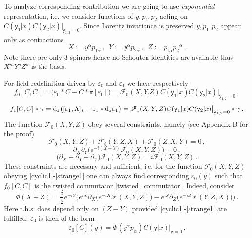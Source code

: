 \documentclass[12pt]{article}
\newcommand{\dr}{{{\rm d}}}
\begin{document}
To analyze corresponding contribution we are going to use {\it exponential} representation, i.e. we consider functions of $y,p_1,p_2$ acting on $C(\mathsf{y}_1|x)C(\mathsf{y}_2|x)\big|_{\mathsf{y}_{1,2}=0}$. Since Lorentz invariance is preserved $y,p_1,p_2$ appear only as contractions
\begin{equation}\label{XYZ}
X:=y^\alpha p_{1\alpha}\,,\;\; Y:=y^\alpha p_{2\alpha}\,,\;\; Z:=p_{1\alpha} p_2 {}^\alpha\,.
\end{equation}
Note there are only 3 spinors hence no Schouten identities are available thus $X^m Y^n Z^k$ is the basis. 

For field redefinition driven by $\varepsilon_0$ and  $\varepsilon_1$ we have respectively
\begin{equation}
f_0[C,C]=\big(\varepsilon_0\ast C-C\ast \pi[\varepsilon_0]\big)=\mathscr{F}_0(X,Y.Z)C(\mathsf{y}_1|x)C(\mathsf{y}_2|x)\big|_{\mathsf{y}_{1,2}=0}\,,
\end{equation}
\begin{equation}
f_1[C,C]\ast \gamma=\dr_z\big([\varepsilon_1,\Lambda]_\ast +\varepsilon_1\ast \dr_z\varepsilon_1\big)=\mathscr{F}_1(X,Y,Z)C(\mathsf{y}_1|x)C(\mathsf{y}_2|x)\big|_{\mathsf{y}_{1,2}=0}\ast \gamma\,.
\end{equation}
The function $\mathscr{F}_0(X,Y,Z)$ obey several constraints, namely (see Appendix B for the proof)
\begin{equation}\label{cyclic1}
\mathscr{F}_0(X,Y,Z)+\mathscr{F}_0(Y,Z,X)+\mathscr{F}_0(Z,X,Y)=0\,,
\end{equation}
\begin{equation}\label{factor1}
\partial_X \partial_Y\Big(e^{-i(X+Y)}\mathscr{F}_0(X,Y,Z)\Big)=0\,,
\end{equation}
\begin{equation}\label{strange1}
\big(\partial_X+\partial_Y+\partial_Z\big)\mathscr{F}_0(X,Y,Z)=i\mathscr{F}_0(X,Y,Z)\,.
\end{equation}
These constraints are necessary and sufficient, i.e. for the function $\mathscr{F}_0(X,Y,Z)$ obeying \eqref{cyclic1}-\eqref{strange1} one can always find corresponding $\varepsilon_0(y)$ such that $f_0[C,C]$ is the twisted commutator \eqref{twisted_commutator}. Indeed, consider
\begin{equation}
\Phi(X-Z)=\frac{i}{2} e^{-iY}\Big(e^{iX}\partial_X\big(e^{-iX}\mathscr{F}(X,Y,Z)\big)-e^{iZ}\partial_Z\big(e^{-iZ} \mathscr{F}(Y,Z,X)\big)\Big)\,.
\end{equation}
Here r.h.s. does depend only on $(Z-Y)$ provided \eqref{cyclic1}-\eqref{strange1} are fulfilled. $\varepsilon_0$ is then of the form
\begin{equation}
\varepsilon_0[C](y)=\Phi(y^\alpha p_\alpha)C(\mathsf{y}|x)\big|_{\mathsf{y}=0}\,.
\end{equation}
\end{document}
